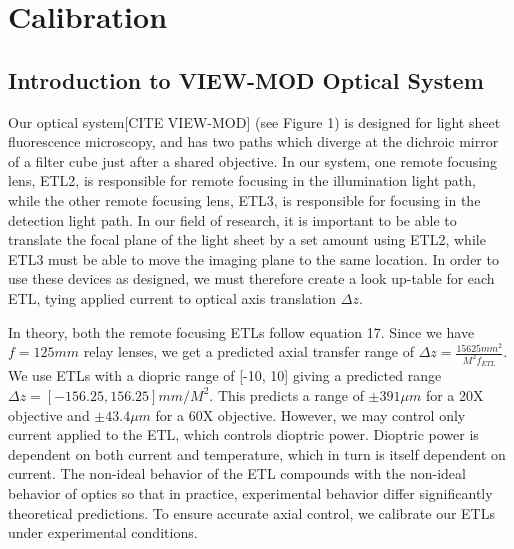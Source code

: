 \section{Calibration}
\subsection{Introduction to VIEW-MOD Optical System}
\par Our optical system[CITE VIEW-MOD] (see Figure 1) is designed for light sheet fluorescence microscopy, and has two paths which diverge at the dichroic mirror of a filter cube just after a shared objective. 
In our system, one remote focusing lens, ETL2, is responsible for remote focusing in the illumination light path, while the other remote focusing lens, ETL3, is responsible for focusing in the detection light path. In our field of research, it is important to be able to translate the focal plane of the light sheet by a set amount using ETL2, while ETL3 must be able to move the imaging plane to the same location.  In order to use these devices as designed, we must therefore create a look up-table for each ETL, tying applied current to optical axis translation $\Delta z$.
\par
In theory, both the remote focusing ETLs follow equation 17. Since we have $f=125mm$ relay lenses, we get a predicted axial transfer range of $\Delta z=\frac{15625mm^2}{M^2 f_{ETL}}$. We use ETLs with a diopric range of [-10, 10] giving a predicted range $\Delta z = [-156.25, 156.25]mm/M^2$. This predicts a range of $\pm 391\mu m$ for a 20X objective and $\pm 43.4 \mu m$ for a 60X objective. However, we may control only current applied to the ETL, which controls dioptric power. Dioptric power is dependent on both current and temperature, which in turn is itself dependent on current. The non-ideal behavior of the ETL compounds with the non-ideal behavior of optics so that in practice, experimental behavior differ significantly theoretical predictions. To ensure accurate axial control, we calibrate our ETLs under experimental conditions.\par

